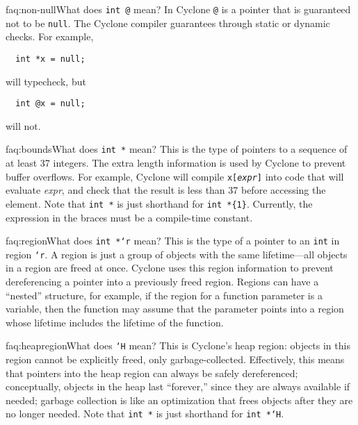 \begin{faqa}{faq:non-null}{What does \texttt{int @} mean?}
In Cyclone \texttt{@} is a pointer that is guaranteed not to be
\texttt{null}.  The Cyclone compiler guarantees through static or
dynamic checks.  For example,
\begin{verbatim}
  int *x = null;
\end{verbatim}
will typecheck, but
\begin{verbatim}
  int @x = null;
\end{verbatim}
will not.
\end{faqa}

\begin{faqa}{faq:bounds}{What does \texttt{int *\rb} mean?}
This is the type of pointers to a sequence of at least 37 integers.
The extra length information is used by Cyclone to prevent buffer
overflows.  For example, Cyclone will compile
\texttt{x[\textup{\textit{expr}}]} into code that will evaluate
\textit{expr}, and check that the result is less than 37 before
accessing the element.  Note that \texttt{int *} is just shorthand for
\verb|int *{1}|.  Currently, the expression in the braces must be a
compile-time constant.
\end{faqa}

\begin{faqa}{faq:region}{What does \texttt{int *`r} mean?}
This is the type of a pointer to an \texttt{int} in region
\texttt{`r}.  A region is just a group of objects with the same
lifetime---all objects in a region are freed at once.  Cyclone uses
this region information to prevent dereferencing a pointer into a
previously freed region.  Regions can have a ``nested'' structure, for
example, if the region for a function parameter is a variable, then
the function may assume that the parameter points into a region whose
lifetime includes the lifetime of the function.
\end{faqa}

\begin{faqa}{faq:heapregion}{What does \texttt{`H} mean?}
  This is Cyclone's heap region: objects in this region cannot be
  explicitly freed, only garbage-collected.  Effectively, this means
  that pointers into the heap region can always be safely
  dereferenced; conceptually, objects in the heap last ``forever,''
  since they are always available if needed; garbage collection is
  like an optimization that frees objects after they are no longer
  needed.  Note that \texttt{int *} is just shorthand for \texttt{int
    *`H}.
\end{faqa}


